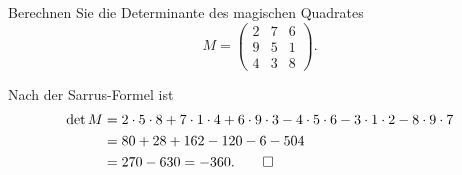 Berechnen Sie die Determinante des magischen Quadrates
\[
M
=
\begin{pmatrix}
   2 &  7 &  6 \\
   9 &  5 &  1 \\
   4 &  3 &  8
\end{pmatrix}.
\]

\begin{loesung}
Nach der Sarrus-Formel ist
\begin{align*}
\det M
&=
  2\cdot 5\cdot 8 + 7\cdot 1 \cdot 4 + 6\cdot 9\cdot 3
- 4\cdot 5\cdot 6 - 3\cdot 1 \cdot 2 - 8\cdot 9\cdot 7
\\
&=
80 + 28 + 162 - 120 - 6 - 504
\\
&=270 - 630
=
-360.
\qedhere
\end{align*}
\end{loesung}
